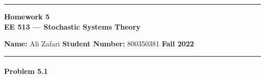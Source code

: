 \documentclass[12pt, letterpaper]{scrartcl}
\begin{document}
    \begin{center}
    	\hrule
    	\vspace{0.4cm}
    	{\textbf { {\large Homework 5} \\ EE 513 --- Stochastic Systems Theory}}
    \end{center}
    { \textbf{Name:} Ali Zafari \hspace{\fill} \textbf{Student Number:} 800350381 \hspace{\fill} \textbf{Fall 2022} } \newline\hrule

\paragraph*{Problem 5.1} \hfill\\
\end{document}
